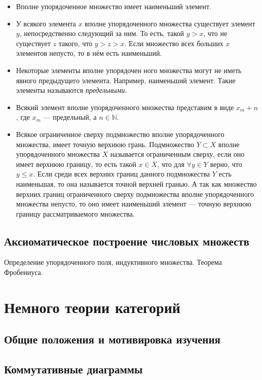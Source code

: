 \documentclass[a4paper]{book}
\begin{document}
\begin{itemize}
	\item Вполне упорядоченное множество имеет наименьший элемент.
	\item У всякого элемента $x$ вполне упорядоченного множества существует элемент $y$, непосредственно следующий за ним. То есть, такой $y>x$, что не существует $z$ такого, что $y>z>x$. Если множество всех больших $x$ элементов непусто, то в нём есть наименьший. 
	\item Некоторые элементы вполне упорядочен ного множества могут не иметь явного предыдущего элемента. Например, наименьший элемент. Такие элементы называются \textit{предельными}. 
	\item Всякий элемент вполне упорядоченного множества представим в виде $x_m + n$, где $x_m$ --- предельный, а $n\in\mathbb{N}$. 
	\item Всякое ограниченное сверху подмножество вполне упорядоченного множества, имеет точную верхнюю грань. Подмножество $Y\subset X$ вполне упорядоченного множества $X$ называется ограниченным сверху, если оно имеет верхнюю границу, то есть такой $x\in X$, что для $\forall y\in Y$ верно, что $y\leq x$. Если среди всех верхних границ данного подмножества $Y$ есть наименьшая, то она называется точной верхней гранью. А так как множество верхних границ ограниченного сверху подмножества вполне упорядоченного множества непусто, то оно имеет наименьший элемент --- точную верхнюю границу рассматриваемого множества. 
	
\end{itemize}

\section{Аксиоматическое построение числовых множеств}

Определение упорядоченного поля, индуктивного множества. Теорема Фробениуса. 

\chapter{Немного теории категорий}

\section{Общие положения и мотивировка изучения}

\section{Коммутативные диаграммы}
\end{document}
